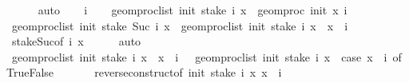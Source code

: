 \begin{isabellebody}
\ \ \ \ \isamarkupfalse%
\ auto\isanewline
{}\isamarkupfalse%
\isanewline
\ \ \isamarkupfalse%
\ i\isanewline
\ \ \isamarkupfalse%
\ {\isachardoublequoteopen}geom{\isacharunderscore}{\kern0pt}proc{\isacharunderscore}{\kern0pt}list\ init\ {\isacharparenleft}{\kern0pt}stake\ i\ x{\isacharparenright}{\kern0pt}\ {\isacharequal}{\kern0pt}\ geom{\isacharunderscore}{\kern0pt}proc\ init\ x\ i{\isachardoublequoteclose}\isanewline
\ \ \isamarkupfalse%
\ {\isachardoublequoteopen}geom{\isacharunderscore}{\kern0pt}proc{\isacharunderscore}{\kern0pt}list\ init\ {\isacharparenleft}{\kern0pt}stake\ {\isacharparenleft}{\kern0pt}Suc\ i{\isacharparenright}{\kern0pt}\ x{\isacharparenright}{\kern0pt}\ {\isacharequal}{\kern0pt}\ geom{\isacharunderscore}{\kern0pt}proc{\isacharunderscore}{\kern0pt}list\ init\ {\isacharparenleft}{\kern0pt}stake\ i\ x\ {\isacharat}{\kern0pt}\ {\isacharbrackleft}{\kern0pt}x\ {\isacharbang}{\kern0pt}{\isacharbang}{\kern0pt}\ i\ {\isacharbrackright}{\kern0pt}{\isacharparenright}{\kern0pt}{\isachardoublequoteclose}\isanewline
\ \ \ \ \isamarkupfalse%
\ stake{\isacharunderscore}{\kern0pt}Suc{\isacharbrackleft}{\kern0pt}of\ i\ x{\isacharbrackright}{\kern0pt}\isanewline
\ \ \ \ \isamarkupfalse%
\ auto\isanewline
\ \ \isamarkupfalse%
\ \isamarkupfalse%
\ {\isachardoublequoteopen}geom{\isacharunderscore}{\kern0pt}proc{\isacharunderscore}{\kern0pt}list\ init\ {\isacharparenleft}{\kern0pt}stake\ i\ x\ {\isacharat}{\kern0pt}\ {\isacharbrackleft}{\kern0pt}x\ {\isacharbang}{\kern0pt}{\isacharbang}{\kern0pt}\ i\ {\isacharbrackright}{\kern0pt}{\isacharparenright}{\kern0pt}\ {\isacharequal}{\kern0pt}\ geom{\isacharunderscore}{\kern0pt}proc{\isacharunderscore}{\kern0pt}list\ init\ {\isacharparenleft}{\kern0pt}stake\ i\ x{\isacharparenright}{\kern0pt}\ {\isacharplus}{\kern0pt}\ {\isacharparenleft}{\kern0pt}case\ x\ {\isacharbang}{\kern0pt}{\isacharbang}{\kern0pt}\ i\ of\ True{\isasymRightarrow}{}{\isacharbar}{\kern0pt}False{\isasymRightarrow}\ {\isacharminus}{\kern0pt}{}{\isacharparenright}{\kern0pt}{\isachardoublequoteclose}\isanewline
\ \ \ \ \isamarkupfalse%
\ reverse{\isacharunderscore}{\kern0pt}construct{\isacharbrackleft}{\kern0pt}of\ init\ {\isachardoublequoteopen}stake\ i\ x{\isachardoublequoteclose}\ {\isachardoublequoteopen}x\ {\isacharbang}{\kern0pt}{\isacharbang}{\kern0pt}\ i{\isachardoublequoteclose}{\isacharbrackright}{\kern0pt}\isanewline
\ \ \ \ \isamarkupfalse%

\end{isabellebody}
